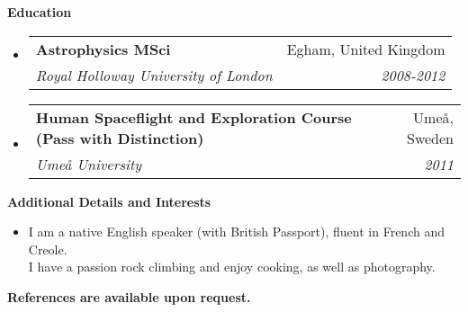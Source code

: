 \documentclass[letterpaper,11pt]{article}
\makeatletter
\newcommand{\resheading}[1]{{\large \colorbox{mygrey}
                            {\begin{minipage}{\textwidth}
                            {\textbf{#1 \vphantom{p\^{E}}}}
                            \end{minipage}}}
}
\newcommand{\ressubheading}[4]{
                \begin{tabular*}{180mm}{l@{\extracolsep{\fill}}r}
                \textbf{#1} & #2 \\
                \textit{#3} & \textit{#4} \\
                \end{tabular*}\vspace{-6pt}
}
\makeatother
\begin{document}
\resheading{Education}
\begin{itemize}
  \item[]
      \ressubheading{Astrophysics MSci }{Egham, United Kingdom}{Royal Holloway University of London}{2008-2012}

  \item[]
    \ressubheading{Human Spaceflight and Exploration Course (Pass with Distinction)}{Ume\r{a}, Sweden}{Ume\r{a} University}{2011}

\end{itemize}

\resheading{Additional Details and Interests}
\begin{itemize}
  \item[] I am a native English speaker (with British Passport), fluent in French and Creole.\\
          I have a passion rock climbing and enjoy cooking, as well as photography. \\
\end{itemize}

\textbf{References are available upon request.}
\end{document}
